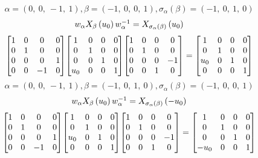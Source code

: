 \documentclass[11pt]{article}
\theoremstyle{definition}
\begin{document}
\[
\alpha = \left( 0, \  0, \  -1, \  1\right), \beta = \left( -1, \  0, \  0, \  1\right), \sigma_{\alpha}(\beta) = \left( -1, \  0, \  1, \  0\right)
\]
\[
\scaletoalign{\textwidth}{w_{\alpha} X_{\beta}\left(u_{0}\right) w_{\alpha}^{-1} = X_{\sigma_{\alpha}\left(\beta\right)}\left(u_{0}\right)}
\]
\[
\scaletoalign{\textwidth}{{\left[\begin{matrix}1 & 0 & 0 & 0\\0 & 1 & 0 & 0\\0 & 0 & 0 & 1\\0 & 0 & -1 & 0\end{matrix}\right]} {\left[\begin{matrix}1 & 0 & 0 & 0\\0 & 1 & 0 & 0\\0 & 0 & 1 & 0\\u_{0} & 0 & 0 & 1\end{matrix}\right]} {\left[\begin{matrix}1 & 0 & 0 & 0\\0 & 1 & 0 & 0\\0 & 0 & 0 & -1\\0 & 0 & 1 & 0\end{matrix}\right]} = {\left[\begin{matrix}1 & 0 & 0 & 0\\0 & 1 & 0 & 0\\u_{0} & 0 & 1 & 0\\0 & 0 & 0 & 1\end{matrix}\right]}}
\]
\[
\alpha = \left( 0, \  0, \  -1, \  1\right), \beta = \left( -1, \  0, \  1, \  0\right), \sigma_{\alpha}(\beta) = \left( -1, \  0, \  0, \  1\right)
\]
\[
\scaletoalign{\textwidth}{w_{\alpha} X_{\beta}\left(u_{0}\right) w_{\alpha}^{-1} = X_{\sigma_{\alpha}\left(\beta\right)}\left(- u_{0}\right)}
\]
\[
\scaletoalign{\textwidth}{{\left[\begin{matrix}1 & 0 & 0 & 0\\0 & 1 & 0 & 0\\0 & 0 & 0 & 1\\0 & 0 & -1 & 0\end{matrix}\right]} {\left[\begin{matrix}1 & 0 & 0 & 0\\0 & 1 & 0 & 0\\u_{0} & 0 & 1 & 0\\0 & 0 & 0 & 1\end{matrix}\right]} {\left[\begin{matrix}1 & 0 & 0 & 0\\0 & 1 & 0 & 0\\0 & 0 & 0 & -1\\0 & 0 & 1 & 0\end{matrix}\right]} = {\left[\begin{matrix}1 & 0 & 0 & 0\\0 & 1 & 0 & 0\\0 & 0 & 1 & 0\\- u_{0} & 0 & 0 & 1\end{matrix}\right]}}
\]
\end{document}
